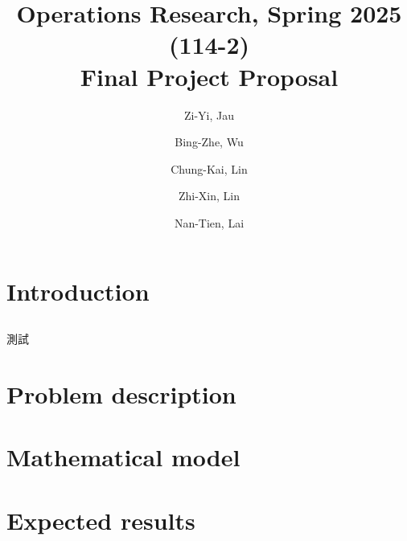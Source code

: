 \documentclass[11pt,a4paper]{article}
\title{Operations Research, Spring 2025 (114-2) \\ Final Project Proposal}
\author{Zi-Yi, Jau} %
\author{Bing-Zhe, Wu} %
\author{Chung-Kai, Lin} %
\author{Zhi-Xin, Lin} %
\author{Nan-Tien, Lai} %
\affil{Department of Information Management, National Taiwan University}
\begin{document}
\section{Introduction}
\subsection{}
測試
\section{Problem description}
\section{Mathematical model}
\section{Expected results}
\end{document}
